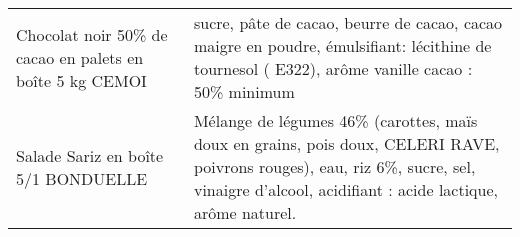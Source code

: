 \begin{longtable}{p{5cm}p{10cm}}
                                                 Chocolat noir 50\% de cacao en palets en boîte 5 kg CEMOI &                                                                                                                                                                                                                                                                                                                                                                                                                                                                                                                                                                                                                                                                                                                                                                                                                                                                                           sucre, pâte de cacao, beurre de cacao, cacao maigre en poudre, émulsifiant: lécithine de tournesol ( E322), arôme vanille  cacao : 50\% minimum \\
                                                                      Salade Sariz en boîte 5/1 BONDUELLE &                                                                                                                                                                                                                                                                                                                                                                                                                                                                                                                                                                                                                                                                                                                                                                                                                                                 Mélange de légumes 46\% (carottes, maïs doux en grains, pois doux, CELERI RAVE, poivrons rouges), eau, riz 6\%, sucre, sel, vinaigre d'alcool, acidifiant : acide lactique, arôme naturel. \\

\end{longtable}
